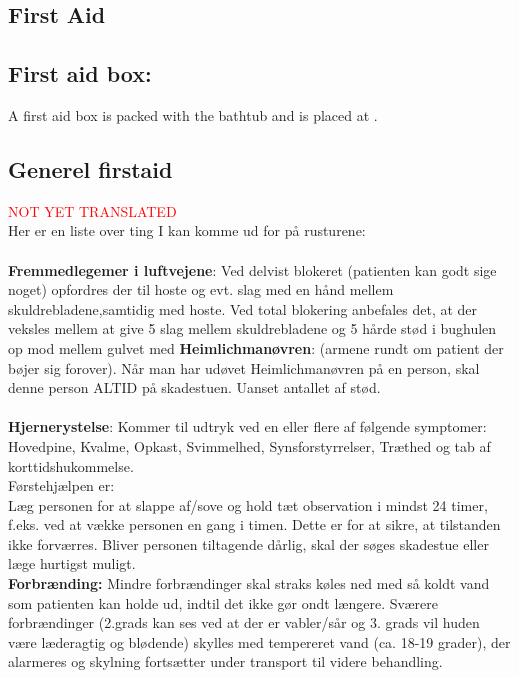\documentclass[../../../main.tex]{subfiles}
\begin{document}
\begin{multicols}{2}
\section{First Aid}
\subsection{First aid box:}
A first aid box is packed with the bathtub and is placed at \placeholder.


\subsection{Generel firstaid}
{\Huge \textcolor{red}{NOT YET TRANSLATED}\\}
Her er en liste over ting I kan komme ud for på rusturene:
\\\\
\textbf{Fremmedlegemer i luftvejene}: Ved delvist blokeret (patienten kan godt sige noget) opfordres der til hoste og evt. slag med en hånd mellem skuldrebladene,samtidig med hoste. Ved total blokering anbefales det, at der veksles mellem at give 5 slag mellem skuldrebladene og 5 hårde stød i bughulen op mod mellem gulvet med \textbf{Heimlichmanøvren}: (armene rundt om patient der bøjer sig forover). Når man har udøvet Heimlichmanøvren på en person, skal denne person ALTID på skadestuen. Uanset antallet af stød.
\\\\
\textbf{Hjernerystelse}: Kommer til udtryk ved en eller flere af følgende symptomer: Hovedpine, Kvalme, Opkast, Svimmelhed, Synsforstyrrelser, Træthed og tab af korttidshukommelse. \\
Førstehjælpen er:\\
Læg personen for at slappe af/sove og hold tæt observation i mindst 24 timer, f.eks. ved at vække personen en gang i timen. Dette er for at sikre, at tilstanden ikke forværres. Bliver personen tiltagende dårlig, skal der søges skadestue eller læge hurtigst muligt.
\\

\textbf{Forbrænding:} Mindre forbrændinger skal straks køles ned med så koldt vand som patienten kan holde ud, indtil det ikke gør ondt længere. Sværere forbrændinger (2.grads kan ses ved at der er vabler/sår og 3. grads vil huden være læderagtig og blødende) skylles med tempereret vand (ca. 18-19 grader), der alarmeres og skylning fortsætter under transport til videre behandling.
\\


\end{multicols}
\end{document}
